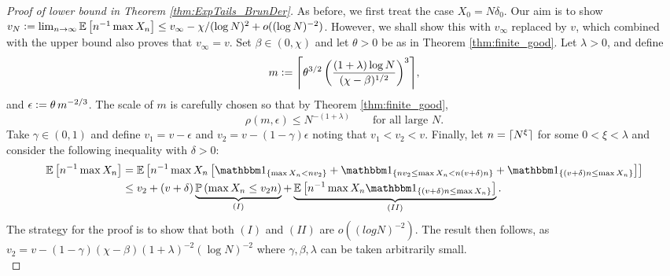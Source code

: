 \begin{proof}[Proof of lower bound in Theorem \ref{thm:ExpTails_BrunDer}]
As before, we first treat the case $X_0 = N \delta_0$. Our aim is to show $v_N \vcentcolon= \lim_{n \to \infty} \mathbb{E}\left[ n^{-1} \max X_n \right] \leq v_\infty - \chi / (\log N)^2 + o((\log N)^{-2})$. However, we shall show this with $v_\infty$ replaced by $v$, which combined with the upper bound also proves that $v_\infty = v$. Set $\beta \in (0, \chi)$ and let $\theta > 0$ be as in Theorem \ref{thm:finite_good}. Let $\lambda > 0$, and define 
\begin{equation}
m \defeq \ceil*{\theta^{3/2}\left( \frac{(1 + \lambda) \log N}{(\chi - \beta)^{1/2}}\right)^3},
\end{equation}
and $\epsilon \vcentcolon= \theta\, m^{-2/3}$. The scale of $m$ is carefully chosen so that by Theorem \ref{thm:finite_good}, 
\begin{equation}
\rho(m, \epsilon) \leq N^{-(1 + \lambda)} \qquad\text{for all large } N. 
\end{equation}
Take $\gamma \in (0, 1)$ and define $v_1 = v - \epsilon$ and $v_2 = v - (1 - \gamma) \epsilon$ noting that $v_1 < v_2 < v$. Finally, let $n = \lceil N^\xi\rceil$ for some $0 < \xi < \lambda$ and consider the following inequality with $\delta > 0$:
\begin{align}
\Ex{n^{-1} \max X_n} &= \Ex{n^{-1} \max X_n \left[ \Ind_{\{ \max X_n < n v_2\}} + \Ind_{\{ n v_2 \leq \max X_n < n (v + \delta)n \}} + \Ind_{\{ (v + \delta)n \leq \max X_n \}} \right]}\nonumber \\
					&\leq v_2 + (v+\delta)\underbrace{\Pr{\max X_n \leq v_2 n}}_{(I)} + \underbrace{\Ex{n^{-1} \max X_n \Ind_{\{ (v + \delta)n \leq \max X_n \}}}}_{(II)}. \label{ExpTailThmDecomposition}
\end{align}
The strategy for the proof is to show that both $(I)$ and $(II)$ are $o((log N)^{-2})$. The result then follows, as $v_2 = v - (1 - \gamma)(\chi - \beta)(1+\lambda)^{-2}(\log N)^{-2}$ where $\gamma, \beta, \lambda$ can be taken arbitrarily small. \\ 


\end{proof}
